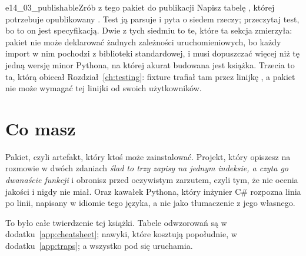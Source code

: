 \begin{exercise}{e14_03_publishable}{Zrób z tego pakiet do publikacji}
Napisz tabelę \code{[project]}, której potrzebuje opublikowany
. Test ją parsuje i pyta o siedem rzeczy; przeczytaj
test, bo to on jest specyfikacją. Dwie z tych siedmiu to te, które ta
sekcja zmierzyła: pakiet nie może deklarować żadnych zależności
uruchomieniowych, bo każdy import w nim pochodzi z biblioteki standardowej,
i musi dopuszczać więcej niż tę jedną wersję minor Pythona, na której
akurat budowana jest książka. Trzecia to ta, którą obiecał
Rozdział~\ref{ch:testing}: fixture  trafiał tam przez linijkę
, a pakiet nie może wymagać tej linijki od swoich
użytkowników.
\end{exercise}

\section{Co masz}
\label{sec:ch14-what}

Pakiet, czyli artefakt, który ktoś może zainstalować. Projekt, który
opiszesz na rozmowie w dwóch zdaniach \dash{} \emph{ślad to trzy zapisy na
jednym indeksie, a czyta go dwanaście funkcji} \dash{} i obronisz przed
oczywistym zarzutem, czyli tym, że nie ocenia jakości i nigdy nie miał.
Oraz kawałek Pythona, który inżynier C\# rozpozna linia po linii, napisany
w idiomie tego języka, a nie jako tłumaczenie z jego własnego.

To było całe twierdzenie tej książki. Tabele odwzorowań są w
dodatku~\ref{app:cheatsheet}; nawyki, które kosztują popołudnie, w
dodatku~\ref{app:traps}; a wszystko pod  się uruchamia.
